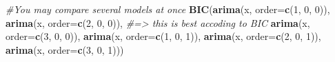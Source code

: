 \documentclass[]{book}
\newenvironment{Shaded}{\begin{snugshade}}{\end{snugshade}}
\newcommand{\CommentTok}[1]{\textcolor[rgb]{0.56,0.35,0.01}{\textit{#1}}}
\newcommand{\DataTypeTok}[1]{\textcolor[rgb]{0.13,0.29,0.53}{#1}}
\newcommand{\DecValTok}[1]{\textcolor[rgb]{0.00,0.00,0.81}{#1}}
\newcommand{\KeywordTok}[1]{\textcolor[rgb]{0.13,0.29,0.53}{\textbf{#1}}}
\newcommand{\NormalTok}[1]{#1}
\begin{document}
\begin{Shaded}
\begin{Highlighting}[]
\CommentTok{#You may compare several models at once}
\KeywordTok{BIC}\NormalTok{(}\KeywordTok{arima}\NormalTok{(x, }\DataTypeTok{order=}\KeywordTok{c}\NormalTok{(}\DecValTok{1}\NormalTok{, }\DecValTok{0}\NormalTok{, }\DecValTok{0}\NormalTok{)), }
    \KeywordTok{arima}\NormalTok{(x, }\DataTypeTok{order=}\KeywordTok{c}\NormalTok{(}\DecValTok{2}\NormalTok{, }\DecValTok{0}\NormalTok{, }\DecValTok{0}\NormalTok{)), }\CommentTok{#=> this is best accoding to BIC}
    \KeywordTok{arima}\NormalTok{(x, }\DataTypeTok{order=}\KeywordTok{c}\NormalTok{(}\DecValTok{3}\NormalTok{, }\DecValTok{0}\NormalTok{, }\DecValTok{0}\NormalTok{)),}
    \KeywordTok{arima}\NormalTok{(x, }\DataTypeTok{order=}\KeywordTok{c}\NormalTok{(}\DecValTok{1}\NormalTok{, }\DecValTok{0}\NormalTok{, }\DecValTok{1}\NormalTok{)),}
    \KeywordTok{arima}\NormalTok{(x, }\DataTypeTok{order=}\KeywordTok{c}\NormalTok{(}\DecValTok{2}\NormalTok{, }\DecValTok{0}\NormalTok{, }\DecValTok{1}\NormalTok{)),}
    \KeywordTok{arima}\NormalTok{(x, }\DataTypeTok{order=}\KeywordTok{c}\NormalTok{(}\DecValTok{3}\NormalTok{, }\DecValTok{0}\NormalTok{, }\DecValTok{1}\NormalTok{)))}
\end{Highlighting}
\end{Shaded}

 
  \providecommand{\huxb}[2]{\arrayrulecolor[RGB]{#1}\global\arrayrulewidth=#2pt}
  \providecommand{\huxvb}[2]{\color[RGB]{#1}\vrule width #2pt}
  \providecommand{\huxtpad}[1]{\rule{0pt}{\baselineskip+#1}}
  \providecommand{\huxbpad}[1]{\rule[-#1]{0pt}{#1}}
\end{document}
